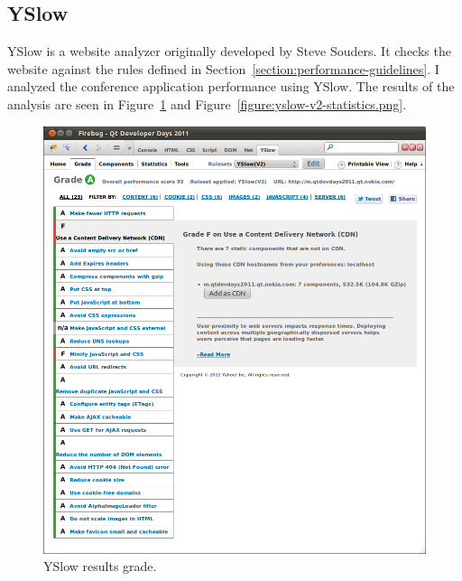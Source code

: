 \subsection{YSlow}

YSlow is a website analyzer originally developed by Steve Souders. It
checks the website against the rules defined in
Section~\ref{section:performance-guidelines}. I analyzed the
conference application performance using YSlow. The results of the
analysis are seen in Figure~\ref{figure:yslow-v2-grade.png} and
Figure~\ref{figure:yslow-v2-statistics.png}.

\begin{figure}[h!]
  \begin{center}
    \includegraphics[width=\textwidth]{images/yslow-v2-grade.png}
    \caption{YSlow results grade.}
    \label{figure:yslow-v2-grade.png}
  \end{center}
\end{figure}

